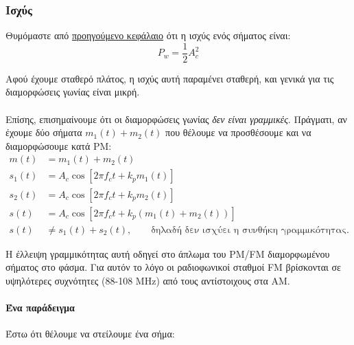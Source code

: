 \documentclass[11pt,a4paper,notitlepage,fleqn]{article}
\begin{document}
\subsubsection{Ισχύς}
Θυμόμαστε από \hyperref[am.power]{προηγούμενο κεφάλαιο} ότι η ισχύς ενός σήματος είναι:
\[
P_w = \frac{1}{2}A_c^2
\]

Αφού έχουμε σταθερό πλάτος, η ισχύς αυτή παραμένει σταθερή, και γενικά για τις διαμορφώσεις
γωνίας είναι μικρή.

\paragraph{}
Επίσης, επισημαίνουμε ότι οι διαμορφώσεις γωνίας \textit{δεν είναι γραμμικές}.
Πράγματι, αν έχουμε δύο σήματα \( m_1(t) + m_2(t) \) που θέλουμε να προσθέσουμε και
να διαμορφώσουμε κατά PM:
\begin{align*}
	m(t) &= m_1(t) + m_2(t) \\
	s_1(t) &= A_c\cos \left[ 2πf_c t + k_p m_1(t) \right] \\
	s_2(t) &= A_c\cos \left[ 2πf_c t + k_p m_2(t) \right] \\
	s(t) &= A_c\cos \left[ 2πf_c t + k_p \left( m_1(t)+m_2(t)\right)\right] \\
	s(t) &\neq s_1(t) + s_2(t), \qquad \text{δηλαδή δεν ισχύει η συνθήκη γραμμικότητας.}
\end{align*}

Η έλλειψη γραμμικότητας αυτή οδηγεί στο άπλωμα του PM/FM διαμορφωμένου σήματος στο φάσμα.
Για αυτόν το λόγο οι ραδιοφωνικοί σταθμοί FM βρίσκονται σε υψηλότερες συχνότητες
(88-108 MHz) από τους αντίστοιχους στα AM.

\paragraph{Ένα παράδειγμα}
Έστω ότι θέλουμε να στείλουμε ένα σήμα:

\end{document}
